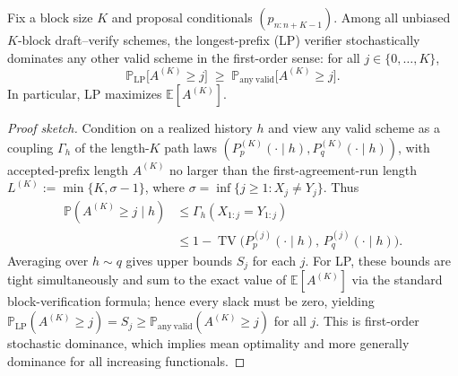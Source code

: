 \begin{theorem}\label{thm:longest-prefix-domination}\sloppy
Fix a block size $K$ and proposal conditionals $(p_{n:n+K-1})$. Among all unbiased $K$-block draft--verify schemes, the longest-prefix (LP) verifier stochastically dominates any other valid scheme in the first-order sense: for all $j\in\{0,\dots,K\}$,
\[
\mathbb{P}_{\mathrm{LP}}\big[A^{(K)}\ge j\big]\;\ge\; \mathbb{P}_{\mathrm{any\ valid}}\big[A^{(K)}\ge j\big].
\]
In particular, LP maximizes $\mathbb{E}[A^{(K)}]$.
\end{theorem}

\begin{proof}[Proof sketch]
Condition on a realized history $h$ and view any valid scheme as a coupling $\Gamma_h$ of the length-$K$ path laws $(P_p^{(K)}(\cdot\mid h),P_q^{(K)}(\cdot\mid h))$, with accepted-prefix length $A^{(K)}$ no larger than the first-agreement-run length $L^{(K)}:=\min\{K,\sigma-1\}$, where $\sigma=\inf\{j\ge1:X_j\ne Y_j\}$. Thus
\[
\begin{aligned}
\mathbb P(A^{(K)}\ge j\mid h)
&\le \Gamma_h(X_{1:j}=Y_{1:j})\\
&\le 1-\operatorname{TV}\Big(P_p^{(j)}(\cdot\mid h),\,P_q^{(j)}(\cdot\mid h)\Big).
\end{aligned}
\]
Averaging over $h\sim q$ gives upper bounds $S_j$ for each $j$. For LP, these bounds are tight simultaneously and sum to the exact value of $\mathbb E[A^{(K)}]$ via the standard block-verification formula; hence every slack must be zero, yielding $\mathbb P_{\mathrm{LP}}(A^{(K)}\ge j)=S_j\ge \mathbb P_{\mathrm{any\ valid}}(A^{(K)}\ge j)$ for all $j$. This is first-order stochastic dominance, which implies mean optimality and more generally dominance for all increasing functionals.\qedhere
\end{proof}

